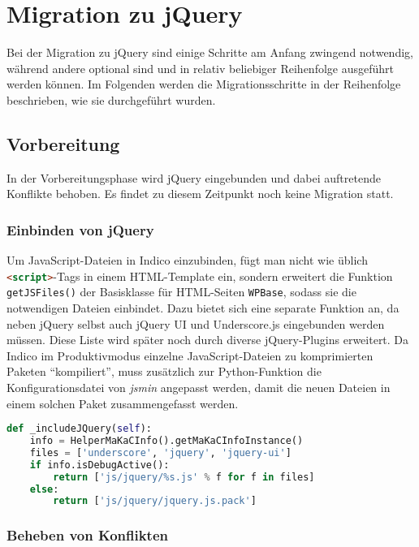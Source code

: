 \chapter{Migration zu jQuery}

Bei der Migration zu jQuery sind einige Schritte am Anfang zwingend notwendig, während
andere optional sind und in relativ beliebiger Reihenfolge ausgeführt werden können. Im Folgenden
werden die Migrationsschritte in der Reihenfolge beschrieben, wie sie durchgeführt wurden.

\section{Vorbereitung}

In der Vorbereitungsphase wird jQuery eingebunden und dabei auftretende Konflikte behoben. Es findet
zu diesem Zeitpunkt noch keine Migration statt.

\subsection{Einbinden von jQuery}

Um JavaScript-Dateien in Indico einzubinden, fügt man nicht wie üblich
\lstinline[language=HTML]{<script>}-Tags in einem HTML-Template ein, sondern erweitert die Funktion
\lstinline{getJSFiles()} der Basisklasse für HTML-Seiten \lstinline{WPBase}, sodass sie die
notwendigen Dateien einbindet. Dazu bietet sich eine separate Funktion an, da neben jQuery selbst
auch jQuery UI und Underscore.js eingebunden werden müssen. Diese Liste wird später noch durch
diverse jQuery-Plugins erweitert. Da Indico im Produktivmodus einzelne JavaScript-Dateien zu
komprimierten Paketen \enquote{kompiliert}, muss zusätzlich zur Python-Funktion die
Konfigurationsdatei von \emph{jsmin} angepasst werden, damit die neuen Dateien in einem solchen
Paket zusammengefasst werden.

\begin{lstlisting}[language=Python,caption=Einbinden von jQuery und Underscore.js in Indico]
def _includeJQuery(self):
    info = HelperMaKaCInfo().getMaKaCInfoInstance()
    files = ['underscore', 'jquery', 'jquery-ui']
    if info.isDebugActive():
        return ['js/jquery/%s.js' % f for f in files]
    else:
        return ['js/jquery/jquery.js.pack']
\end{lstlisting}

\subsection{Beheben von Konflikten}

